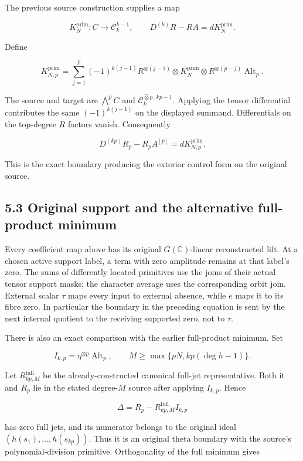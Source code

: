 \documentclass[
  11pt,
]{article}
\begin{document}
The previous source construction supplies a map

\[
K_N^{\mathrm{prim}}:C\to\mathcal C_k^{k-1},
\qquad D^{(k)}R-RA=dK_N^{\mathrm{prim}}.
\]

Define

\[
\boxed{
K_{N,p}^{\mathrm{prim}}
=\sum_{j=1}^p(-1)^{k(j-1)}
R^{\otimes(j-1)}\otimes K_N^{\mathrm{prim}}\otimes R^{\otimes(p-j)}
\operatorname{Alt}_p.
}
\]

The source and target are \(\bigwedge^pC\) and
\(\mathcal C_k^{\widehat\otimes p,\,kp-1}\). Applying the tensor
differential contributes the same \((-1)^{k(j-1)}\) on the displayed
summand. Differentials on the top-degree \(R\) factors vanish.
Consequently

\[
\boxed{
D^{(kp)}R_p-R_pA^{[p]}=dK_{N,p}^{\mathrm{prim}}.
}
\]

This is the exact boundary producing the exterior control form on the
original source.

\subsection{5.3 Original support and the alternative full-product
minimum}\label{original-support-and-the-alternative-full-product-minimum}

Every coefficient map above has its original \(G(\mathbb C)\)-linear
reconstructed lift. At a chosen active support label, a term with zero
amplitude remains at that label's zero. The sums of differently located
primitives use the joins of their actual tensor support masks; the
character average uses the corresponding orbit join. External scalar
\(\tau\) maps every input to external absence, while \(e\) maps it to
its fibre zero. In particular the boundary in the preceding equation is
sent by the next internal quotient to the receiving supported zero, not
to \(\tau\).

There is also an exact comparison with the earlier full-product minimum.
Set

\[
I_{k,p}=\eta^{\otimes p}\operatorname{Alt}_p,
\qquad M\geq\max\{pN,kp(\deg h-1)\}.
\]

Let \(R_{kp,M}^{\mathrm{full}}\) be the already-constructed canonical
full-jet representative. Both it and \(R_p\) lie in the stated
degree-\(M\) source after applying \(I_{k,p}\). Hence

\[
\Delta=R_p-R_{kp,M}^{\mathrm{full}}I_{k,p}
\]

has zero full jets, and its numerator belongs to the original ideal
\((h(s_1),\ldots,h(s_{kp}))\). Thus it is an original theta boundary
with the source's polynomial-division primitive. Orthogonality of the
full minimum gives
\end{document}
